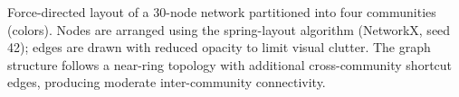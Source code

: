\caption{Force-directed layout of a 30-node network partitioned into four communities (colors). Nodes are arranged using the spring-layout algorithm (NetworkX, seed 42); edges are drawn with reduced opacity to limit visual clutter. The graph structure follows a near-ring topology with additional cross-community shortcut edges, producing moderate inter-community connectivity.}

